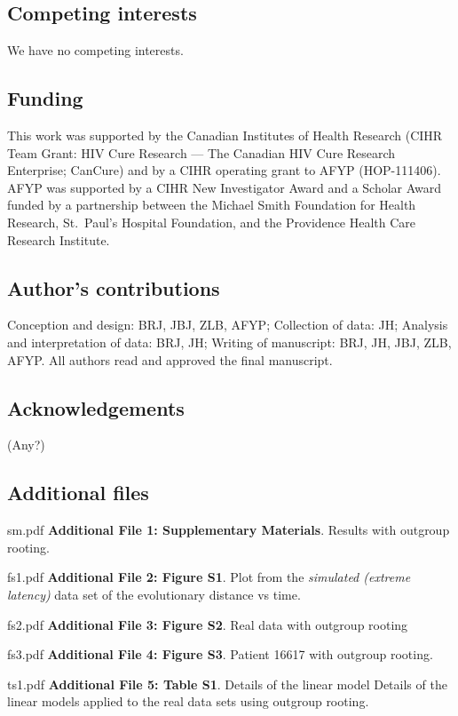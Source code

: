 \documentclass[12pt]{article}
\begin{document}
\subsection*{Competing interests}
We have no competing interests.

\subsection*{Funding}
This work was supported by the Canadian Institutes of Health Research (CIHR Team Grant: HIV Cure Research --- The Canadian HIV Cure Research Enterprise; CanCure) and by a CIHR operating grant to AFYP (HOP-111406).
AFYP was supported by a CIHR New Investigator Award and a Scholar Award funded by a partnership between the Michael Smith Foundation for Health Research, St.~Paul's Hospital Foundation, and the Providence Health Care Research Institute.


\subsection*{Author's contributions}
Conception and design: BRJ, JBJ, ZLB, AFYP; Collection of data: JH; Analysis and interpretation of data: BRJ, JH; Writing of manuscript: BRJ, JH, JBJ, ZLB, AFYP. All authors read and approved the final manuscript.

\subsection*{Acknowledgements}
(Any?)

\subsection*{Additional files}
sm.pdf {\bf Additional File 1: Supplementary Materials}. Results with outgroup rooting.

fs1.pdf {\bf Additional File 2: Figure S1}. Plot from the \emph{simulated (extreme latency)} data set of the evolutionary distance vs time.

fs2.pdf {\bf Additional File 3: Figure S2}. Real data with outgroup rooting

fs3.pdf {\bf Additional File 4: Figure S3}. Patient 16617 with outgroup rooting.

ts1.pdf {\bf Additional File 5: Table S1}. Details of the linear model Details of the linear models applied to the real data sets using outgroup rooting.

\end{document}
